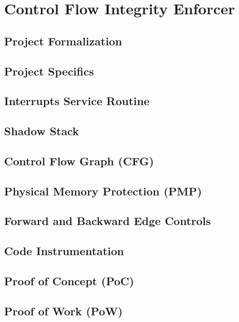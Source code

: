 \chapter{Control Flow Integrity Enforcer}
\label{cha:project}

\lipsum[1]

\section{Project Formalization}
\label{sec:project_formalization}

\lipsum[1]

\section{Project Specifics}
\label{sec:project_specifics}

\lipsum[1]

\section{Interrupts Service Routine}
\label{sec:project_isr}

\lipsum[1]

\section{Shadow Stack}
\label{sec:project_ss}

\lipsum[1]
\section{Control Flow Graph (CFG)}
\label{sec:project_cfg}

\lipsum[1]
\section{Physical Memory Protection (PMP)}
\label{sec:project_pmp}

\lipsum[1]

\section{Forward and Backward Edge Controls}
\label{sec:project_controls}

\lipsum[1]

\section{Code Instrumentation}
\label{sec:project_instrumentation}

\lipsum[1]

\section{Proof of Concept (PoC)}
\label{sec:project_poc}

\lipsum[1]

\section{Proof of Work (PoW)}
\label{sec:project_pow}

\lipsum[1]